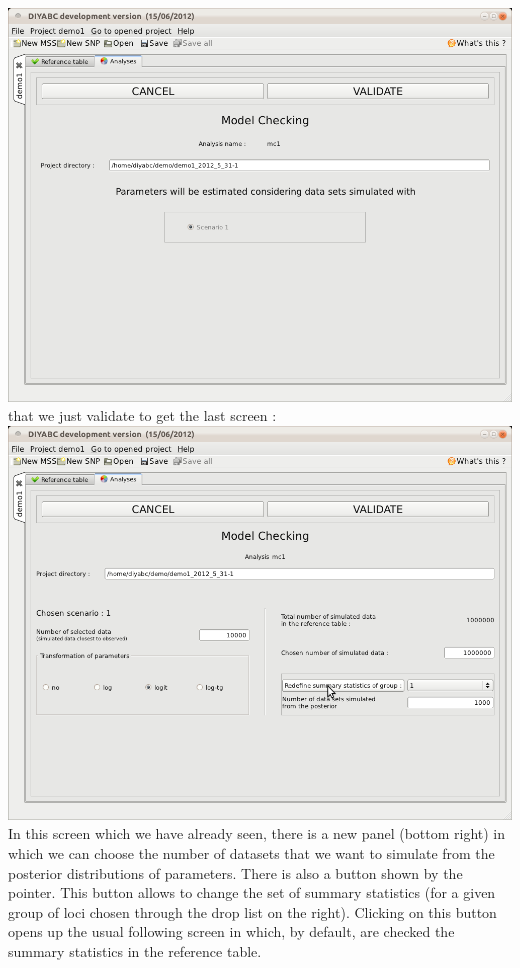 \includegraphics[scale=0.35]{gui_pictures/Capture-DIYABC-54.png} \\

that we just validate to get the last screen :\\

\includegraphics[scale=0.35]{gui_pictures/Capture-DIYABC-55.png} \\

In this screen which we have already seen, there is a new panel (bottom right) in which we can choose the number of datasets that we want to simulate from the posterior distributions of parameters. There is also a button   shown by the pointer. This button allows to change the set of summary statistics (for a given group of loci chosen through the drop list on the right). Clicking on this button opens up the usual following screen in which, by default, are checked the summary statistics in the reference table.\\

